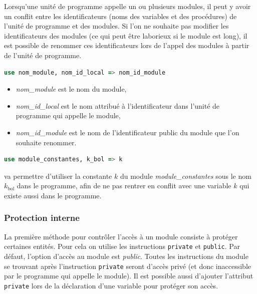 \documentclass[a4paper,twoside]{article}
\begin{document}
\bigskip

\begin{attention}
Lorsqu'une unité de programme appelle un ou plusieurs modules, il peut y avoir un conflit entre les identificateurs (noms des variables et des procédures) de l'unité de programme et des modules. Si l'on ne souhaite pas modifier les identificateurs des modules (ce qui peut être laborieux si le module est long), il est possible de renommer ces identificateurs lors de l'appel des modules à partir de l'unité de programme.
\begin{lstlisting}[language=Fortran]
use nom_module, nom_id_local => nom_id_module
\end{lstlisting}

\begin{itemize}
\item \emph{nom\_module} est le nom du module,
\item \emph{nom\_id\_local} est le nom attribué à l'identificateur 
dans l'unité de programme qui appelle le module,
\item \emph{nom\_id\_module} est le nom de l'identificateur public du 
module que l'on souhaite renommer.
\end{itemize}
\end{attention}


\begin{exemple}
\begin{lstlisting}[language=Fortran]
use module_constantes, k_bol => k
\end{lstlisting}
va permettre d'utiliser la constante $k$ du module \emph{module\_constantes} sous le nom $k_\text{bol}$ dans le programme, afin de ne pas rentrer en conflit avec une variable $k$ qui existe aussi dans le programme.
\end{exemple}


\subsubsection{Protection interne}
La première méthode pour contrôler l'accès à un module consiste à protéger certaines entités. Pour cela on utilise les instructions \texttt{private} et \texttt{public}. Par défaut, l'option d'accès au module est \emph{public}. Toutes les instructions du module se trouvant après l'instruction \texttt{private} seront d'accès privé (et donc inaccessible par le programme qui appelle le module). Il est possible aussi d'ajouter l'attribut \texttt{private} lors de la déclaration d'une variable pour protéger son accès.
\end{document}
